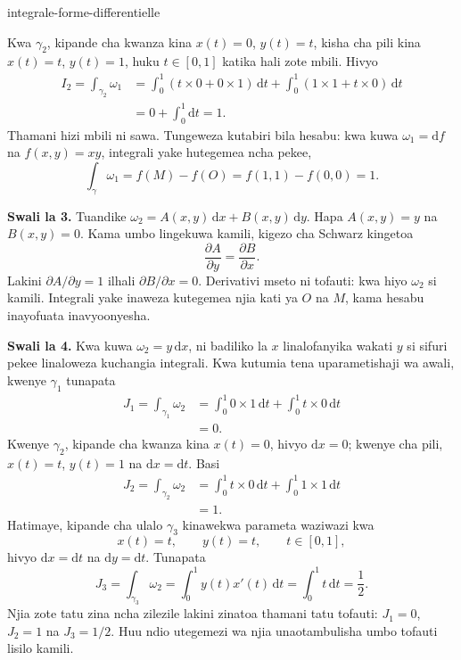 \begin{exo}{integrale-forme-differentielle}
\begin{solution}
Kwa $\gamma_2$, kipande cha kwanza kina $x(t)=0$, $y(t)=t$, kisha cha pili
kina $x(t)=t$, $y(t)=1$, huku $t\in[0,1]$ katika hali zote mbili. Hivyo
\[
\begin{aligned}
I_2
= \int_{\gamma_2}\omega_1
&= \int_0^1\left(t\times 0+0\times 1\right)\,\mathrm{d}t
 + \int_0^1\left(1\times 1+t\times 0\right)\,\mathrm{d}t \\
&= 0+\int_0^1\mathrm{d}t = 1.
\end{aligned}
\]
Thamani hizi mbili ni sawa. Tungeweza kutabiri bila hesabu: kwa kuwa
$\omega_1=\mathrm{d}f$ na $f(x,y)=xy$, integrali yake hutegemea ncha pekee,
\[
\int_\gamma\omega_1=f(M)-f(O)=f(1,1)-f(0,0)=1.
\]

\textbf{Swali la 3.} Tuandike $\omega_2=A(x,y)\,\mathrm{d}x+B(x,y)\,\mathrm{d}y$.
Hapa $A(x,y)=y$ na $B(x,y)=0$. Kama umbo lingekuwa kamili, kigezo cha Schwarz kingetoa
\[
\frac{\partial A}{\partial y}=\frac{\partial B}{\partial x}.
\]
Lakini $\partial A/\partial y=1$ ilhali $\partial B/\partial x=0$.
Derivativi mseto ni tofauti: kwa hiyo $\omega_2$ si kamili. Integrali yake
inaweza kutegemea njia kati ya $O$ na $M$, kama hesabu inayofuata inavyoonyesha.

\textbf{Swali la 4.} Kwa kuwa $\omega_2=y\,\mathrm{d}x$, ni badiliko la $x$
linalofanyika wakati $y$ si sifuri pekee linaloweza kuchangia integrali.
Kwa kutumia tena uparametishaji wa awali, kwenye $\gamma_1$ tunapata
\[
\begin{aligned}
J_1
=\int_{\gamma_1}\omega_2
&=\int_0^1 0\times 1\,\mathrm{d}t
  +\int_0^1 t\times 0\,\mathrm{d}t \\
&=0.
\end{aligned}
\]
Kwenye $\gamma_2$, kipande cha kwanza kina $x(t)=0$, hivyo $\mathrm{d}x=0$;
kwenye cha pili, $x(t)=t$, $y(t)=1$ na $\mathrm{d}x=\mathrm{d}t$. Basi
\[
\begin{aligned}
J_2
=\int_{\gamma_2}\omega_2
&=\int_0^1 t\times 0\,\mathrm{d}t
  +\int_0^1 1\times 1\,\mathrm{d}t \\
&=1.
\end{aligned}
\]
Hatimaye, kipande cha ulalo $\gamma_3$ kinawekwa parameta waziwazi kwa
\[
x(t)=t,\qquad y(t)=t,\qquad t\in[0,1],
\]
hivyo $\mathrm{d}x=\mathrm{d}t$ na $\mathrm{d}y=\mathrm{d}t$. Tunapata
\[
J_3
=\int_{\gamma_3}\omega_2
=\int_0^1 y(t)x'(t)\,\mathrm{d}t
=\int_0^1 t\,\mathrm{d}t
=\frac12.
\]
Njia zote tatu zina ncha zilezile lakini zinatoa thamani tatu tofauti:
$J_1=0$, $J_2=1$ na $J_3=1/2$. Huu ndio utegemezi wa njia unaotambulisha
umbo tofauti lisilo kamili.
\end{solution}
\end{exo}

